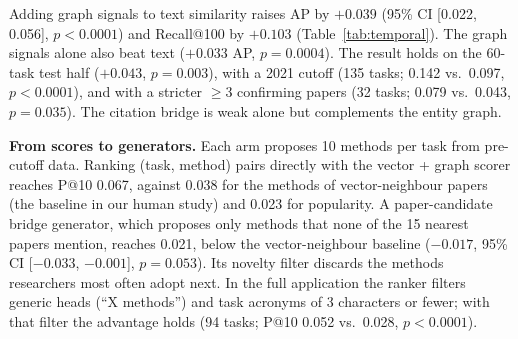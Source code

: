 \documentclass[conference]{IEEEtran}
\begin{document}
\begin{table}[t]
\centering
\caption{Time-sliced discovery, 120 tasks (cutoff 2022)}
\label{tab:temporal}
\end{table}

Adding graph signals to text similarity raises AP by $+0.039$ (95\% CI [0.022, 0.056], $p < 0.0001$) and Recall@100 by $+0.103$ (Table~\ref{tab:temporal}). The graph signals alone also beat text ($+0.033$ AP, $p = 0.0004$). The result holds on the 60-task test half ($+0.043$, $p = 0.003$), with a 2021 cutoff (135 tasks; 0.142 vs.\ 0.097, $p < 0.0001$), and with a stricter $\geq 3$ confirming papers (32 tasks; 0.079 vs.\ 0.043, $p = 0.035$). The citation bridge is weak alone but complements the entity graph.

\textbf{From scores to generators.} Each arm proposes 10 methods per task from pre-cutoff data. Ranking (task, method) pairs directly with the vector + graph scorer reaches P@10 0.067, against 0.038 for the methods of vector-neighbour papers (the baseline in our human study) and 0.023 for popularity. A paper-candidate bridge generator, which proposes only methods that none of the 15 nearest papers mention, reaches 0.021, below the vector-neighbour baseline ($-0.017$, 95\% CI [$-0.033$, $-0.001$], $p = 0.053$). Its novelty filter discards the methods researchers most often adopt next. In the full application the ranker filters generic heads (``X methods'') and task acronyms of 3 characters or fewer; with that filter the advantage holds (94 tasks; P@10 0.052 vs.\ 0.028, $p < 0.0001$).
\end{document}
